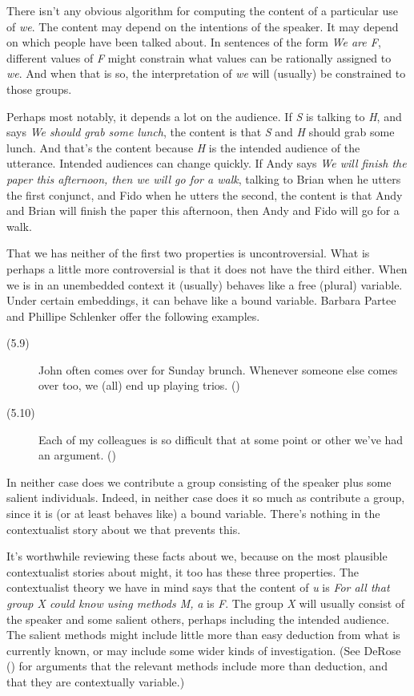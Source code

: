 \documentclass[
  11pt,
  letterpaper,
  DIV=11,
  numbers=noendperiod,
  twoside]{scrartcl}
\begin{document}
There isn't any obvious algorithm for computing the content of a
particular use of \emph{we}. The content may depend on the intentions of
the speaker. It may depend on which people have been talked about. In
sentences of the form \emph{We are F}, different values of \emph{F}
might constrain what values can be rationally assigned to \emph{we}. And
when that is so, the interpretation of \emph{we} will (usually) be
constrained to those groups.

Perhaps most notably, it depends a lot on the audience. If \emph{S} is
talking to \emph{H}, and says \emph{We should grab some lunch}, the
content is that \emph{S} and \emph{H} should grab some lunch. And that's
the content because \emph{H} is the intended audience of the utterance.
Intended audiences can change quickly. If Andy says \emph{We will finish
the paper this afternoon, then we will go for a walk}, talking to Brian
when he utters the first conjunct, and Fido when he utters the second,
the content is that Andy and Brian will finish the paper this afternoon,
then Andy and Fido will go for a walk.

That we has neither of the first two properties is uncontroversial. What
is perhaps a little more controversial is that it does not have the
third either. When we is in an unembedded context it (usually) behaves
like a free (plural) variable. Under certain embeddings, it can behave
like a bound variable. Barbara Partee and Phillipe Schlenker offer the
following examples.

\begin{description}
\item[(5.9)]
John often comes over for Sunday brunch. Whenever someone else comes
over too, we (all) end up playing trios.
()
\item[(5.10)]
Each of my colleagues is so difficult that at some point or other we've
had an argument. ()
\end{description}

In neither case does we contribute a group consisting of the speaker
plus some salient individuals. Indeed, in neither case does it so much
as contribute a group, since it is (or at least behaves like) a bound
variable. There's nothing in the contextualist story about we that
prevents this.

It's worthwhile reviewing these facts about we, because on the most
plausible contextualist stories about might, it too has these three
properties. The contextualist theory we have in mind says that the
content of \emph{u} is \emph{For all that group X could know using
methods M,} \emph{a} is \emph{F}. The group \emph{X} will usually
consist of the speaker and some salient others, perhaps including the
intended audience. The salient methods might include little more than
easy deduction from what is currently known, or may include some wider
kinds of investigation. (See DeRose ()
for arguments that the relevant methods include more than deduction, and
that they are contextually variable.)
\end{document}
